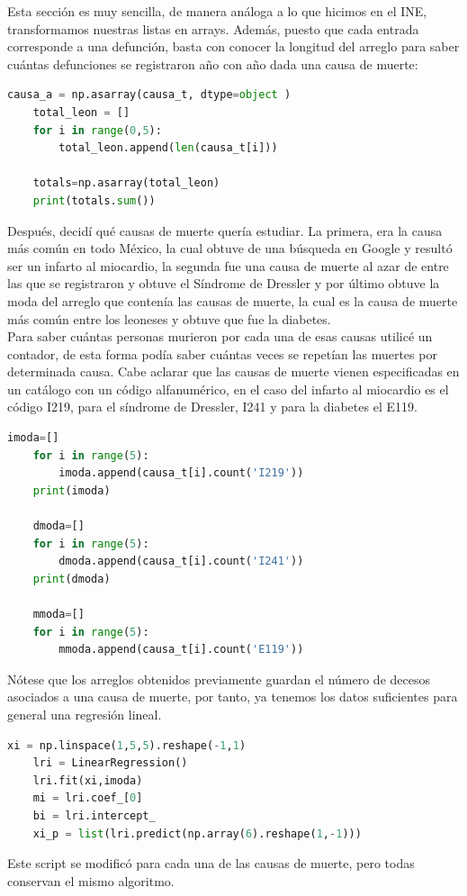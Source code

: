 \documentclass[12pt,letterpaper]{article}
\begin{document}
Esta sección es muy sencilla, de manera análoga a lo que hicimos en el INE, transformamos nuestras listas en arrays. Además, puesto que cada entrada corresponde a una defunción, basta con conocer la longitud del arreglo para saber cuántas defunciones se registraron año con año dada una causa de muerte:
\scriptsize{\begin{lstlisting}[language=Python]
    causa_a = np.asarray(causa_t, dtype=object )
    total_leon = []
    for i in range(0,5):
        total_leon.append(len(causa_t[i]))
        
    totals=np.asarray(total_leon)
    print(totals.sum())
\end{lstlisting}}
\normalsize{Después, decidí qué causas de muerte quería estudiar. La primera, era la causa más común en todo México, la cual obtuve de una búsqueda en Google y resultó ser un infarto al miocardio, la segunda fue una causa de muerte al azar de entre las que se registraron y obtuve el Síndrome de Dressler y por último obtuve la moda del arreglo que contenía las causas de muerte, la cual es la causa de muerte más común entre los leoneses y obtuve que fue la diabetes.}\\

Para saber cuántas personas murieron por cada una de esas causas utilicé un contador, de esta forma podía saber cuántas veces se repetían las muertes por determinada causa. Cabe aclarar que las causas de muerte vienen especificadas en un catálogo con un código alfanumérico, en el caso del infarto al miocardio es el código I219, para el síndrome de Dressler, I241 y para la diabetes el E119.
\scriptsize{\begin{lstlisting}[language=Python]
    imoda=[]
    for i in range(5):
        imoda.append(causa_t[i].count('I219'))
    print(imoda)
    
    dmoda=[]
    for i in range(5):
        dmoda.append(causa_t[i].count('I241'))
    print(dmoda)
    
    mmoda=[]
    for i in range(5):
        mmoda.append(causa_t[i].count('E119'))
\end{lstlisting}}
\normalsize{Nótese que los arreglos obtenidos previamente guardan el número de decesos asociados a una causa de muerte, por tanto, ya tenemos los datos suficientes para general una regresión lineal.}
\scriptsize{\begin{lstlisting}[language=Python]
    xi = np.linspace(1,5,5).reshape(-1,1)
    lri = LinearRegression()
    lri.fit(xi,imoda)
    mi = lri.coef_[0]
    bi = lri.intercept_
    xi_p = list(lri.predict(np.array(6).reshape(1,-1)))
\end{lstlisting}}
\normalsize{Este script se modificó para cada una de las causas de muerte, pero todas conservan el mismo algoritmo.}\\
\end{document}
